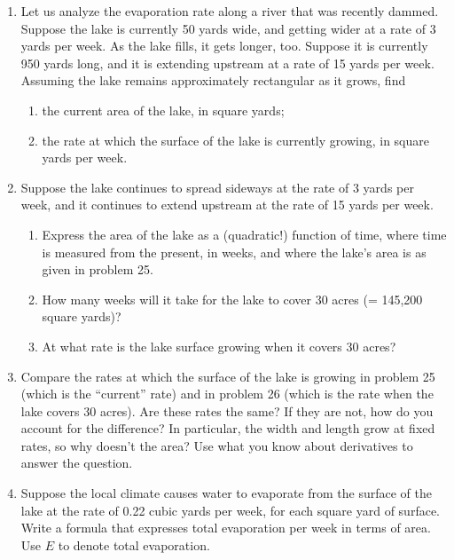 \begin{enumerate}
\item Let us analyze the evaporation rate along a river that was
recently dammed.  Suppose the lake is currently 50 yards wide, and
getting wider at a rate of 3 yards per week.  As the lake fills, it
gets longer, too.  Suppose it is currently 950 yards long, and it is
extending upstream at a rate of 15 yards per week. Assuming the lake
remains approximately rectangular as it grows, find



  \begin{enumerate}
  \item the current area of the lake, in square yards;


  \item the rate at which the surface of the lake is currently growing,
in square yards per week.


\end{enumerate}
\item Suppose the lake continues to spread sideways at the rate of 3
yards per week, and it continues to extend upstream at the rate of 15
yards per week.

  \begin{enumerate}
  \item Express the area of the lake as a (quadratic!)
function of time, where time is measured from the present, in weeks,
and where the lake's area is as given in problem 25.

  \item How many weeks will it take for the lake to cover 30 acres (=
145,200 square yards)?

  \item At what rate is the lake surface growing when it covers 30 acres?



\end{enumerate}
\item Compare the rates at which the surface of the lake is growing in
problem 25 (which is the ``current'' rate) and in problem 26 (which is
the rate when the lake covers 30 acres).  Are these rates the same?
If they are not, how do you account for the difference?  In
particular, the width and length grow at fixed rates, so why doesn't
the area?  Use what you know about derivatives to answer the question.


\item Suppose the local climate causes water to evaporate from the
surface of the lake at the rate of 0.22 cubic yards per week, for each
square yard of surface.  Write a formula that expresses total
evaporation per week in terms of area.  Use $E$ to denote total
evaporation.



\end{enumerate}
